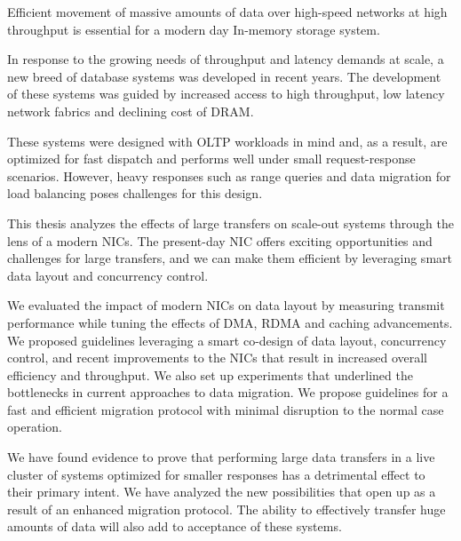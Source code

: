 

Efficient movement of massive amounts of data over high-speed networks at high 
throughput is essential for a modern day In-memory storage system.

In response to the growing needs of throughput and latency demands at scale, a new breed of database systems was developed in recent years. The development of these systems was guided by increased access to high throughput, low latency network fabrics and declining cost of DRAM.

These systems were designed with OLTP workloads in mind and, as a result, are optimized for fast dispatch and performs well under small
request-response scenarios. However, heavy responses such as range queries and data migration for load balancing poses challenges for this design.  

This thesis analyzes the effects of large transfers on scale-out systems
through the lens of a modern NICs. The present-day NIC offers exciting opportunities and challenges for large transfers, and we can make them efficient by leveraging smart data layout and concurrency control.

We evaluated the impact of modern NICs on data layout by measuring transmit performance while tuning the effects of DMA, RDMA and caching advancements. We proposed guidelines
leveraging a smart co-design of data layout, concurrency control, and recent improvements to the NICs that result in increased overall efficiency and throughput. We also set up experiments that underlined the bottlenecks in current approaches to data migration. We propose guidelines for a fast and efficient migration protocol with minimal disruption to the normal case operation.

We have found evidence to prove that performing large data transfers in a live cluster of systems optimized for smaller responses has a detrimental effect to their primary intent. 
We have analyzed the new possibilities that open up as a result of an enhanced migration protocol. The ability to effectively transfer huge amounts of data will also add to acceptance of these systems.
